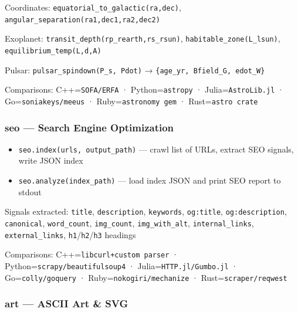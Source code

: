 \documentclass[
]{article}
\providecommand{\tightlist}{%
  \setlength{\itemsep}{0pt}\setlength{\parskip}{0pt}}
\begin{document}
Coordinates: \texttt{equatorial\_to\_galactic(ra,dec)},
\texttt{angular\_separation(ra1,dec1,ra2,dec2)}

Exoplanet: \texttt{transit\_depth(rp\_rearth,rs\_rsun)},
\texttt{habitable\_zone(L\_lsun)}, \texttt{equilibrium\_temp(L,d,A)}

Pulsar: \texttt{pulsar\_spindown(P\_s,\ Pdot)} →
\texttt{\{age\_yr,\ Bfield\_G,\ edot\_W\}}

Comparisons: C++=\texttt{SOFA/ERFA} · Python=\texttt{astropy} ·
Julia=\texttt{AstroLib.jl} · Go=\texttt{soniakeys/meeus} ·
Ruby=\texttt{astronomy\ gem} · Rust=\texttt{astro\ crate}

\subsubsection{seo --- Search Engine
Optimization}\label{seo-search-engine-optimization}

\begin{itemize}
\tightlist
\item
  \texttt{seo.index(urls,\ output\_path)} --- crawl list of URLs,
  extract SEO signals, write JSON index
\item
  \texttt{seo.analyze(index\_path)} --- load index JSON and print SEO
  report to stdout
\end{itemize}

Signals extracted: \texttt{title}, \texttt{description},
\texttt{keywords}, \texttt{og:title}, \texttt{og:description},
\texttt{canonical}, \texttt{word\_count}, \texttt{img\_count},
\texttt{img\_with\_alt}, \texttt{internal\_links},
\texttt{external\_links}, \texttt{h1}/\texttt{h2}/\texttt{h3} headings

Comparisons: C++=\texttt{libcurl+custom\ parser} ·
Python=\texttt{scrapy/beautifulsoup4} · Julia=\texttt{HTTP.jl/Gumbo.jl}
· Go=\texttt{colly/goquery} · Ruby=\texttt{nokogiri/mechanize} ·
Rust=\texttt{scraper/reqwest}

\subsubsection{art --- ASCII Art \& SVG}\label{art-ascii-art-svg}
\end{document}

